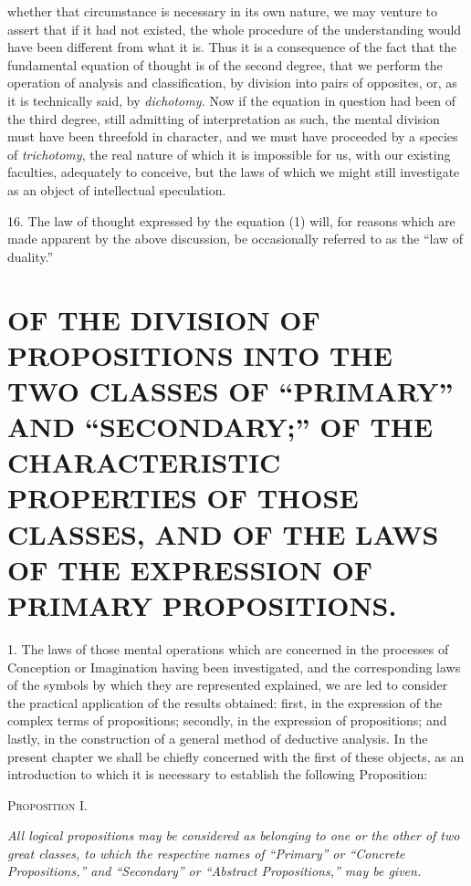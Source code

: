 \documentclass[oneside]{book}
\begin{document}
whether that circumstance is necessary in its own nature, we
may venture to assert that if it had not existed, the whole procedure
of the understanding would have been different from what
it is. Thus it is a consequence of the fact that the fundamental
equation of thought is of the second degree, that we perform the
operation of analysis and classification, by division into pairs of
opposites, or, as it is technically said, by \textit{dichotomy.} Now if the
equation in question had been of the third degree, still admitting
of interpretation as such, the mental division must have been
threefold in character, and we must have proceeded by a species
of \textit{trichotomy}, the real nature of which it is impossible for us,
with our existing faculties, adequately to conceive, but the laws
of which we might still investigate as an object of intellectual
speculation.

16. The law of thought expressed by the equation (1) will,
for reasons which are made apparent by the above discussion, be
occasionally referred to as the ``law of duality.''

\chapter[DIVISION OF PROPOSITIONS]
{\large OF THE DIVISION OF PROPOSITIONS INTO THE TWO CLASSES OF
``PRIMARY'' AND ``SECONDARY;'' OF THE CHARACTERISTIC PROPERTIES
OF THOSE CLASSES, AND OF THE LAWS OF THE EXPRESSION
OF PRIMARY PROPOSITIONS.}

1. The laws of those mental operations which are concerned
in the processes of Conception or Imagination having
been investigated, and the corresponding laws of the symbols
by which they are represented explained, we are led to consider
the practical application of the results obtained: first, in the
expression of the complex terms of propositions; secondly, in
the expression of propositions; and lastly, in the construction of
a general method of deductive analysis. In the present chapter
we shall be chiefly concerned with the first of these objects, as
an introduction to which it is necessary to establish the following
Proposition:

\begin{center}
\textsc{Proposition I.}
\end{center}

\textit{All logical propositions may be considered as belonging to one
or the other of two great classes, to which the respective names of
``Primary'' or ``Concrete Propositions,'' and ``Secondary'' or ``Abstract
Propositions,'' may be given.}
\end{document}
